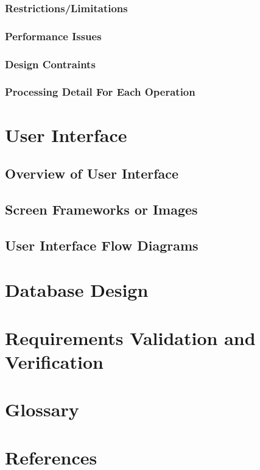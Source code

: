 \documentclass[11pt]{article}
\begin{document}
\subsubsection{Restrictions/Limitations}
\label{sec:restrictions}

\subsubsection{Performance Issues}
\label{sec:performance}

\subsubsection{Design Contraints}
\label{sec:designconstraints}

\subsubsection{Processing Detail For Each Operation}
\label{sec:operation}

\section{User Interface}
\label{sec:userinterface}

\subsection{Overview of User Interface}
\label{sec:overviewui}

\subsection{Screen Frameworks or Images}
\label{sec:frameworks}

\subsection{User Interface Flow Diagrams}
\label{sec:flowdiagrams}

\section{Database Design}
\label{sec:database}

\section{Requirements Validation and Verification}
\label{sec:validation}

\section{Glossary}
\label{sec:glossary}

\section{References}
\label{sec:references}

\end{document}

